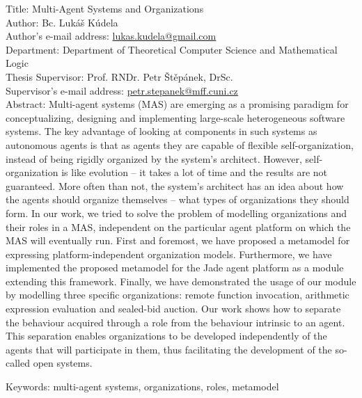 
Title: Multi-Agent Systems and Organizations\\
Author: Bc. Lukáš Kúdela\\
Author's e-mail address: \url{lukas.kudela@gmail.com}\\
Department: Department of Theoretical Computer Science and Mathematical Logic\\
Thesis Supervisor: Prof. RNDr. Petr Štěpánek, DrSc.\\
Supervisor's e-mail address: \url{petr.stepanek@mff.cuni.cz}\\

Abstract: Multi-agent systems (MAS) are emerging as a promising paradigm for conceptualizing, designing and implementing large-scale heterogeneous software systems.
The key advantage of looking at components in such systems as autonomous agents is that as agents they are capable of flexible self-organization, instead of being rigidly organized by the system's architect.
However, self-organization is like evolution -- it takes a lot of time and the results are not guaranteed.
More often than not, the system's architect has an idea about how the agents should organize themselves -- what types of organizations they should form.
In our work, we tried to solve the problem of modelling organizations and their roles in a MAS, independent on the particular agent platform on which the MAS will eventually run.
First and foremost, we have proposed a metamodel for expressing platform-independent organization models.
Furthermore, we have implemented the proposed metamodel for the Jade agent platform as a module extending this framework.
Finally, we have demonstrated the usage of our module by modelling three specific organizations: remote function invocation, arithmetic expression evaluation and sealed-bid auction.
Our work shows how to separate the behaviour acquired through a role from the behaviour intrinsic to an agent. 
This separation enables organizations to be developed independently of the agents that will participate in them, thus facilitating the development of the so-called open systems.

Keywords: multi-agent systems, organizations, roles, metamodel